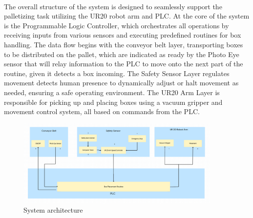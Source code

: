 

\paragraph{}The overall structure of the system is designed to seamlessly support the palletizing task utilizing the UR20 robot arm and PLC. At the core of the system is the Programmable Logic Controller, which orchestrates all operations by receiving inputs from various sensors and executing predefined routines for box handling. The data flow begins with the conveyor belt layer, transporting boxes to be distributed on the pallet, which are indicated as ready by the Photo Eye sensor that will relay information to the PLC to move onto the next part of the routine, given it detects a box incoming. The Safety Sensor Layer regulates movement detects human presence to dynamically adjust or halt movement as needed, ensuring a safe operating environment. The UR20 Arm Layer is responsible for picking up and placing boxes using a vacuum gripper and movement control system, all based on commands from the PLC.

\begin{figure}[h!]
	\centering
 	\includegraphics[width=0.90\textwidth]{images/dataflow.png}
 \caption{System architecture}
\end{figure}